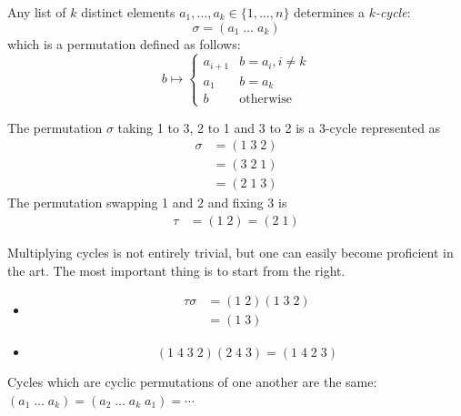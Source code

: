 \documentclass{../../template/note}
\begin{document}
    \begin{definition}
        Any list of \(k\) distinct elements \(a_1, \dots, a_k \in \{1, \dots, n\}\) determines a \emph{\(k\)-cycle}:
        \[
            \sigma = (a_1 \; \dots \; a_k)
        \]
        which is a permutation defined as follows:
        \[
            b \mapsto \begin{cases}
                a_{i+1} & b = a_i, i \neq k \\
                a_1 & b = a_k \\
                b & \text{otherwise}
            \end{cases}
        \]
    \end{definition}
    \begin{example}
        The permutation \(\sigma\) taking 1 to 3, 2 to 1 and 3 to 2 is a 3-cycle represented as
        \begin{align*}
            \sigma &= (1\; 3\; 2) \\
            &= (3\; 2\; 1) \\
            &= (2\; 1\; 3)
        \end{align*}
        The permutation swapping 1 and 2 and fixing 3 is
        \begin{align*}
            \tau &= (1 \; 2) = (2\; 1)
        \end{align*}
    \end{example}
    Multiplying cycles is not entirely trivial, but one can easily become proficient in the art. The most important thing is to start from the right.
    \begin{example}
        \begin{itemize}
            \item \begin{align*}
                \tau \sigma &= (1 \; 2)(1 \; 3 \; 2) \\
                &= (1\; 3)
            \end{align*}
            \item \[
                (1\; 4\; 3\; 2)(2\; 4\; 3) = (1\; 4\; 2\; 3)
            \]
        \end{itemize}
    \end{example}
    
    \begin{remark*}
        Cycles which are cyclic permutations of one another are the same: \((a_1\; \dots \; a_k) = (a_2 \; \dots \; a_k\; a_1) = \cdots\)
    \end{remark*}
    
\end{document}
